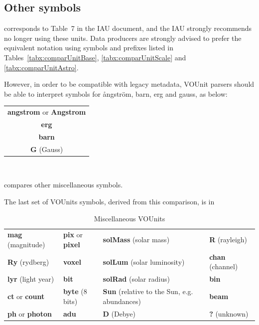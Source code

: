 \documentclass[11pt,notitlepage,onecolumn]{ivoa}
\newcommand{\unit}[1]{\textbf{\textsf{\color{orange}#1}}}
\begin{document}
\subsection{Other symbols}

 corresponds to Table~7 in the IAU document, and the IAU strongly
recommends no longer using these units. 
Data producers are strongly advised to prefer the equivalent notation using symbols and prefixes listed in 
Tables~\ref{tabx:comparUnitBase}, \ref{tabx:comparUnitScale} and \ref{tabx:comparUnitAstro}. 

However, in order to be compatible with legacy metadata, VOUnit parsers should be able to interpret
symbols for \aa{}ngstr\"om, barn, erg and gauss, as below:

\medskip

\begin{center}
\begin{tabular}{|c|}\hline
\def\arraystretch{1.2}
\unit{angstrom} or \unit{Angstrom}\\
\unit{erg}    	\\
\unit{barn}\\
\unit{G} (Gauss)    		\\\hline
\end{tabular}\\
\end{center}

\medskip

 compares other miscellaneous symbols. 

The last set of VOUnits symbols, derived from this comparison, is in

\begin{table}[ht]
\begin{center}
\def\arraystretch{1.2}
\begin{tabular}{|l|l|p{3cm}|l|}\hline
\unit{mag} (magnitude)		&\unit{pix}  or \unit{pixel} 	&\unit{solMass} (solar mass)     &\unit{R} (rayleigh) \\
\unit{Ry} (rydberg)		&\unit{voxel}    		&\unit{solLum} (solar luminosity)&\unit{chan} (channel) 	\\
\unit{lyr} (light year)		&\unit{bit}   			&\unit{solRad} (solar radius)	&\unit{bin} \\
\unit{ct} or \unit{count}	&\unit{byte} (8 bits)   	&\unit{Sun} (relative to the Sun, e.g. abundances)&\unit{beam} 	\\
\unit{ph} or \unit{photon} 	&\unit{adu}     		&\unit{D} (Debye)	&\unit{?} (unknown)\\\hline
\end{tabular}
\end{center}
\caption{\label{tab:voumisc}Miscellaneous VOUnits}
\end{table}
\end{document}
